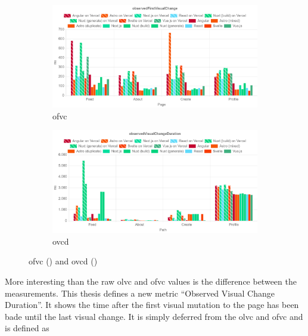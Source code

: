 \documentclass[a4paper, 12pt]{article}
\begin{document}
\begin{figure}[ht!]
  \centering
  \begin{subfigure}{0.95\linewidth}
    \begin{center}
      \includegraphics[width=\linewidth, keepaspectratio]{img/lighthouse-results/OFVC.png}
    \end{center}
    \caption{\acrfull{ofvc}}
    \label{subfig:LH:observedFirstVisualChange}
  \end{subfigure}
  \begin{subfigure}{0.95\linewidth}
    \begin{center}
      \includegraphics[width=\linewidth, keepaspectratio]{img/lighthouse-results/olvc-ofvc.png}
    \end{center}
    \caption{\acrfull{ovcd}}\label{subfig:LH:observedVisualChangeDuration}
    \label{fig:LH:OVCD}
  \end{subfigure}
  \caption{\acrfull{ofvc} () and \acrfull{ovcd} ()}
\end{figure}

More interesting than the raw \acrshort{olvc} and \acrshort{ofvc} values is the difference between the measurements.
This thesis defines a new metric \enquote{Observed Visual Change Duration}.
It shows the time after the first visual mutation to the page has been bade until the last visual change.
It is simply deferred from the \acrshort{olvc} and \acrshort{ofvc} and is defined as
\end{document}
